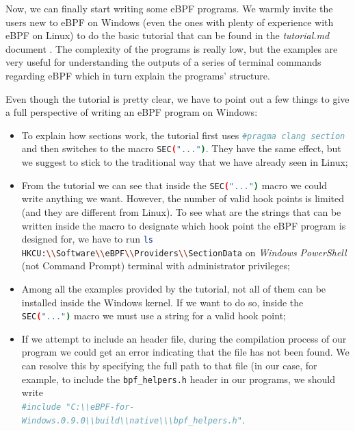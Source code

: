 Now, we can finally start writing some eBPF programs.
We warmly invite the users new to eBPF on Windows (even the ones with plenty of experience with eBPF on Linux) to do the basic tutorial that can be found in the \textit{tutorial.md} document \cite{TutDoc}.
The complexity of the programs is really low, but the examples are very useful for understanding the outputs of a series of terminal commands regarding eBPF which in turn explain the programs' structure.

Even though the tutorial is pretty clear, we have to point out a few things to give a full perspective of writing an eBPF program on Windows:

\begin{itemize}
	\item 
		To explain how sections work, the tutorial first uses \colorbox{backcolour}{\lstinline[style=commandline, language=bash, breaklines=true]|#pragma clang section|} and then switches to the macro \colorbox{backcolour}{\lstinline[style=commandline, language=bash, breaklines=true]|SEC("...")|}.
		They have the same effect, but we suggest to stick to the traditional way that we have already seen in Linux; 
	\item 
		From the tutorial we can see that inside the \colorbox{backcolour}{\lstinline[style=commandline, language=bash, breaklines=true]|SEC("...")|} macro we could write anything we want.
		However, the number of valid hook points is limited (and they are different from Linux).
		To see what are the strings that can be written inside the macro to designate which hook point the eBPF program is designed for, we have to run \colorbox{backcolour}{\lstinline[style=commandline, language=bash, breaklines=true]|ls HKCU:\\Software\\eBPF\\Providers\\SectionData|} on \textit{Windows PowerShell} (not Command Prompt) terminal with administrator privileges;
	\item 
		Among all the examples provided by the tutorial, not all of them can be installed inside the Windows kernel.
		If we want to do so, inside the \colorbox{backcolour}{\lstinline[style=commandline, language=bash, breaklines=true]|SEC("...")|} macro we must use a string for a valid hook point;
	\item 
		If we attempt to include an header file, during the compilation process of our program we could get an error indicating that the file has not been found.
		We can resolve this by specifying the full path to that file (in our case, for example, to include the \colorbox{backcolour}{\lstinline[style=commandline, language=bash, breaklines=true]|bpf_helpers.h|} header in our programs, we should write\\\colorbox{backcolour}{\lstinline[style=commandline, language=bash, breaklines=true]|#include "C:\\eBPF-for-Windows.0.9.0\\build\\native\\\bpf_helpers.h"|}.
\end{itemize}

